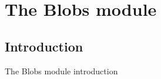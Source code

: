 \section{The Blobs module}

\subsection{Introduction}
\label{sec:blobs_introduction}
The Blobs module introduction
